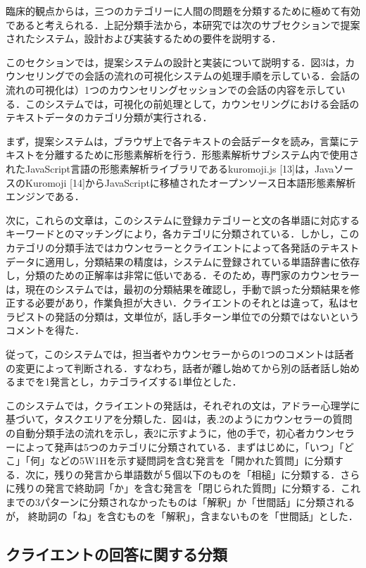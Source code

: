 \documentclass[shuuron]{kuee}
\begin{document}
臨床的観点からは，三つのカテゴリーに人間の問題を分類するために極めて有効であると考えられる．上記分類手法から，本研究では次のサブセクションで提案されたシステム，設計および実装するための要件を説明する．

このセクションでは，提案システムの設計と実装について説明する．図3は，カウンセリングでの会話の流れの可視化システムの処理手順を示している．会話の流れの可視化は）1つのカウンセリングセッションでの会話の内容を示している．このシステムでは，可視化の前処理として，カウンセリングにおける会話のテキストデータのカテゴリ分類が実行される．

まず，提案システムは，ブラウザ上で各テキストの会話データを読み，言葉にテキストを分離するために形態素解析を行う．形態素解析サブシステム内で使用されたJavaScript言語の形態素解析ライブラリであるkuromoji.js [13]は，JavaソースのKuromoji [14]からJavaScriptに移植されたオープンソース日本語形態素解析エンジンである．

次に，これらの文章は，このシステムに登録カテゴリーと文の各単語に対応するキーワードとのマッチングにより，各カテゴリに分類されている．しかし，このカテゴリの分類手法ではカウンセラーとクライエントによって各発話のテキストデータに適用し，分類結果の精度は，システムに登録されている単語辞書に依存し，分類のための正解率は非常に低いである．そのため，専門家のカウンセラーは，現在のシステムでは，最初の分類結果を確認し，手動で誤った分類結果を修正する必要があり，作業負担が大きい．クライエントのそれとは違って，私はセラピストの発話の分類は，文単位が，話し手ターン単位での分類ではないというコメントを得た．

従って，このシステムでは，担当者やカウンセラーからの1つのコメントは話者の変更によって判断される．すなわち，話者が離し始めてから別の話者話し始めるまでを1発言とし，カテゴライズする1単位とした．

このシステムでは，クライエントの発話は，それぞれの文は，アドラー心理学に基づいて，タスクエリアを分類した．図4は，表.2のようにカウンセラーの質問の自動分類手法の流れを示し，表2に示すように，他の手で，初心者カウンセラーによって発声は5つのカテゴリに分類されている．まずはじめに，「いつ」「どこ」「何」などの5W1Hを示す疑問詞を含む発言を「開かれた質問」に分類する．次に，残りの発言から単語数が５個以下のものを「相槌」に分類する．さらに残りの発言で終助詞「か」を含む発言を「閉じられた質問」に分類する．これまでの3パターンに分類されなかったものは「解釈」か「世間話」に分類されるが，
終助詞の「ね」を含むものを「解釈」，含まないものを「世間話」とした．


\subsection{クライエントの回答に関する分類}
\end{document}
